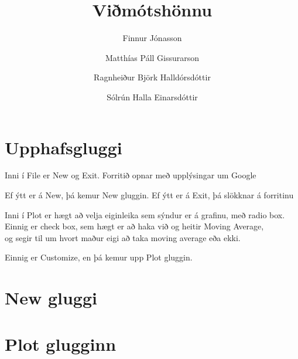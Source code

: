 \documentclass{article}
\begin{document}
\pagestyle{empty} %

\title{Viðmótshönnu} \author{Finnur Jónasson \and Matthías Páll
  Gissurarson \and Ragnheiður Björk Halldórsdóttir \and Sólrún Halla
  Einarsdóttir}

\section{Upphafsgluggi}

\noindent
Inni í File er New og Exit.  Forritið opnar með upplýsingar um Google

\noindent
Ef ýtt er á New, þá kemur New gluggin.  Ef ýtt er á Exit, þá slökknar
á forritinu

\noindent
Inni í Plot er hægt að velja eiginleika sem sýndur er á grafinu, með
radio box.\\  Einnig er check box, sem hægt er að haka við og heitir
Moving Average,\\ og segir til um hvort maður eigi að taka moving
average eða ekki.

\noindent
Einnig er Customize, en þá kemur upp Plot gluggin.

\section{New gluggi}



\section{Plot glugginn}

\end{document}
